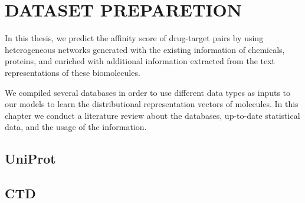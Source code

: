 \chapter{DATASET PREPARETION}
In this thesis, we predict the affinity score of drug-target pairs by using heterogeneous networks generated with the existing information of chemicals, proteins, and enriched with additional information extracted from the text representations of these biomolecules.

We compiled several databases in order to use different data types as inputs to our models to learn the distributional representation vectors of molecules. In this chapter we conduct a literature review about the databases, up-to-date statistical data, and the usage of the information.







\section{UniProt}
\section{CTD}

